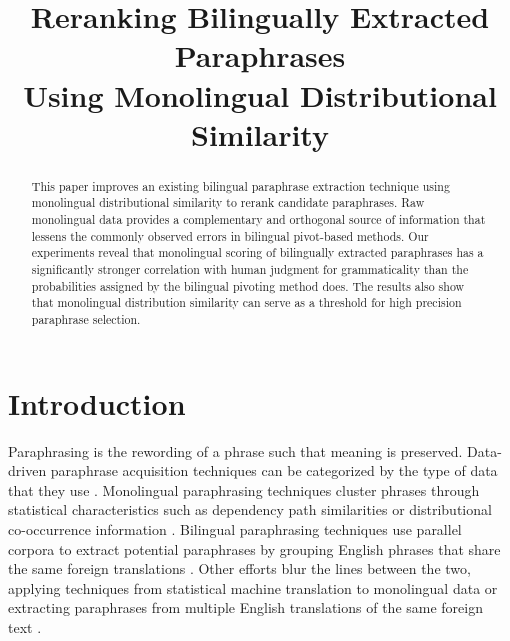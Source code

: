 \documentclass[11pt]{article}
\title{Reranking Bilingually Extracted Paraphrases \\ Using Monolingual Distributional Similarity}
\date{}
\newcommand{\mnote}[1]{\marginpar{\raggedleft\footnotesize\itshape#1}}
\begin{document}
\maketitle
\begin{abstract}
\vspace{-.2cm}
This paper improves an existing bilingual paraphrase extraction technique using monolingual distributional similarity to rerank candidate paraphrases.  Raw monolingual data provides a complementary and orthogonal source of information that lessens the commonly observed errors in bilingual pivot-based methods. %
Our experiments reveal that monolingual scoring of bilingually extracted paraphrases has a significantly stronger correlation with human judgment for grammaticality than the probabilities assigned by the bilingual pivoting method does. The results also show that monolingual distribution similarity can serve as a threshold for high precision paraphrase selection.


\end{abstract} 


\vspace{-.25cm}
\section{Introduction}
Paraphrasing is the rewording of a phrase such that meaning is preserved. Data-driven paraphrase acquisition techniques can be categorized by the type of data that they use \cite{MadnaniDorr10}.  Monolingual paraphrasing techniques cluster phrases through statistical characteristics such as dependency path similarities or distributional co-occurrence information \cite{Lin01discoveryof,PascaDienes05}.   Bilingual paraphrasing techniques use parallel corpora to extract potential paraphrases by grouping English phrases that share the same foreign translations \cite{BannardCallisonBurch05}.  Other efforts blur the lines between the two, applying techniques from statistical machine translation to monolingual data or extracting paraphrases from multiple English translations of the same foreign text \cite{Barzilay2001,PangEtAl03,QuirkDolanBrockett04}.
\end{document}
